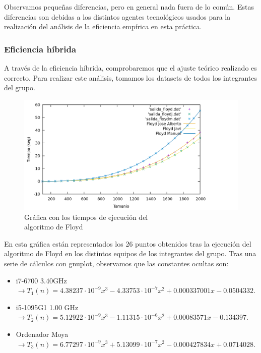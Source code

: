 \documentclass[10pt,a4paper]{article}
\begin{document}
Observamos pequeñas diferencias, pero en general nada fuera de lo común. Estas diferencias son debidas a los distintos agentes tecnológicos usados para la realización del análisis de la eficiencia empírica en esta práctica.

\subsubsection{Eficiencia híbrida}

A través de la eficiencia híbrida, comprobaremos que el ajuste teórico realizado es correcto. Para realizar este análisis, tomamos los datasets de todos los integrantes del grupo. \\

\begin{figure}[h!]
\centering
\includegraphics[scale=0.15]{../../Images/floyd_combinados.png}
\caption{Gráfica con los tiempos de ejecución del \\algoritmo de Floyd}
\end{figure}

En esta gráfica están representados los 26 puntos obtenidos tras la ejecución del algoritmo de Floyd en los distintos equipos de los integrantes del grupo. Tras una serie de cálculos con gnuplot, observamos que las constantes ocultas son:
\begin{itemize}
	\item i7-6700 3.40GHz \(\rightarrow T_1(n) = 4.38237 \cdot 10^{-9} x^3 -4.33753 \cdot 10^{-7} x^2 + 0.000337001 x -0.0504332\).
	\item i5-1095G1 1.00 GHz \(\rightarrow T_2(n) = 5.12922 \cdot 10^{-9} x^3 -1.11315 \cdot 10^{-6} x^2 + 0.00083571 x - 0.134397\).
	\item Ordenador Moya \(\rightarrow T_3(n) = 6.77297 \cdot 10^{-9} x^3 + 5.13099 \cdot 10^{-7} x^2 - 0.000427834 x + 0.0714028\).
\end{itemize} 
\end{document}
